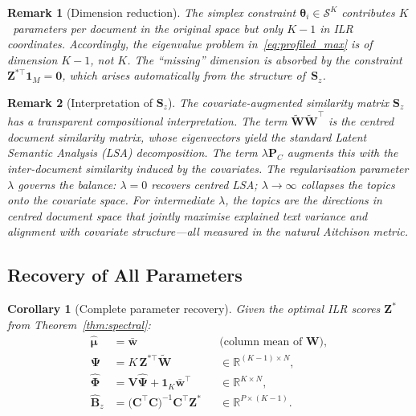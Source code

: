 \documentclass{article}
\newtheorem{corollary}[theorem]{Corollary}
\newtheorem{remark}{Remark}
\begin{document}
\begin{remark}[Dimension reduction]
\label{rem:dimension_reduction}
The simplex constraint $\boldsymbol{\theta}_i\in\mathcal{S}^K$
contributes $K$~parameters per document in the original space but only
$K{-}1$ in ILR coordinates. Accordingly, the eigenvalue problem
in~\eqref{eq:profiled_max} is of dimension $K{-}1$, not $K$. The
``missing'' dimension is absorbed by the constraint
$\mathbf{Z}^{*\top}\mathbf{1}_M = \mathbf{0}$, which arises
automatically from the structure of~$\mathbf{S}_z$.
\end{remark}

\begin{remark}[Interpretation of $\mathbf{S}_z$]
\label{rem:Sz_interpretation}
The covariate-augmented similarity matrix $\mathbf{S}_z$ has a
transparent compositional interpretation. The term
$\widetilde{\mathbf{W}}\widetilde{\mathbf{W}}^{\!\top}$ is the centred
document similarity matrix, whose eigenvectors yield the standard
Latent Semantic Analysis (LSA) decomposition.
The term $\lambda\mathbf{P}_C$ augments this with the inter-document
similarity induced by the covariates.
The regularisation parameter $\lambda$ governs the balance:
$\lambda=0$ recovers centred LSA;
$\lambda\to\infty$ collapses the topics onto the covariate space.
For intermediate $\lambda$, the topics are the directions in
\emph{centred} document space that jointly maximise explained text
variance and alignment with covariate structure---all measured in the
natural Aitchison metric.
\end{remark}


\subsection{Recovery of All Parameters}
\label{subsec:recovery}

\begin{corollary}[Complete parameter recovery]
\label{cor:recovery}
Given the optimal ILR scores $\mathbf{Z}^*$
from Theorem~\ref{thm:spectral}:
\begin{align}
  \hat{\boldsymbol{\mu}}
    &= \bar{\mathbf{w}}
    &&\text{(column mean of }\mathbf{W}\text{)},
    \label{eq:mu_recovery}\\[4pt]
  \hat{\boldsymbol{\Psi}}
    &= K\,\mathbf{Z}^{*\top}\widetilde{\mathbf{W}}
    &&\in\mathbb{R}^{(K{-}1)\times N},
    \label{eq:Psi_recovery}\\[4pt]
  \hat{\boldsymbol{\Phi}}
    &= \mathbf{V}\hat{\boldsymbol{\Psi}}
       + \mathbf{1}_K\bar{\mathbf{w}}^{\!\top}
    &&\in\mathbb{R}^{K\times N},
    \label{eq:Phi_recovery}\\[4pt]
  \hat{\mathbf{B}}_z
    &= \bigl(\mathbf{C}^{\!\top}\mathbf{C}\bigr)^{-1}
       \mathbf{C}^{\!\top}\mathbf{Z}^*
    &&\in\mathbb{R}^{P\times(K{-}1)}.
    \label{eq:Bz_recovery}
\end{align}
\end{corollary}
\end{document}
